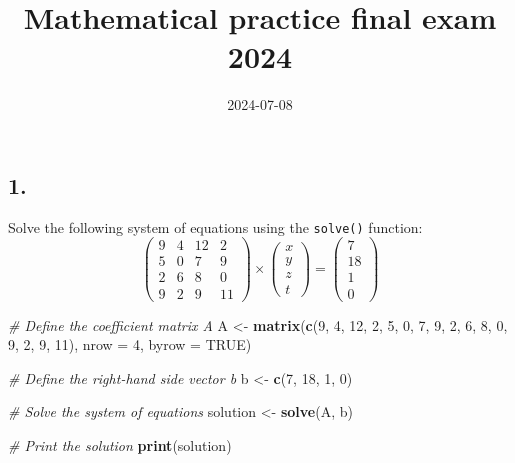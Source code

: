 \documentclass[
]{article}
\title{Mathematical practice final exam 2024}
\author{}
\date{\vspace{-2.5em}2024-07-08}
\newenvironment{Shaded}{\begin{snugshade}}{\end{snugshade}}
\newcommand{\AttributeTok}[1]{\textcolor[rgb]{0.13,0.29,0.53}{#1}}
\newcommand{\CommentTok}[1]{\textcolor[rgb]{0.56,0.35,0.01}{\textit{#1}}}
\newcommand{\ConstantTok}[1]{\textcolor[rgb]{0.56,0.35,0.01}{#1}}
\newcommand{\DecValTok}[1]{\textcolor[rgb]{0.00,0.00,0.81}{#1}}
\newcommand{\FunctionTok}[1]{\textcolor[rgb]{0.13,0.29,0.53}{\textbf{#1}}}
\newcommand{\NormalTok}[1]{#1}
\newcommand{\OtherTok}[1]{\textcolor[rgb]{0.56,0.35,0.01}{#1}}
\begin{document}
\maketitle

\subsection{1.}\label{section}

Solve the following system of equations using the \texttt{solve()}
function: \[
\left(\begin{array}{cccc}
9 & 4 & 12 & 2 \\
5 & 0 & 7 & 9 \\
2 & 6 & 8 & 0 \\
9 & 2 & 9 & 11
\end{array}\right) \times\left(\begin{array}{l}
x \\
y \\
z \\
t
\end{array}\right)=\left(\begin{array}{c}
7 \\
18 \\
1 \\
0
\end{array}\right)
\]

\begin{Shaded}
\begin{Highlighting}[]
\CommentTok{\# Define the coefficient matrix A}
\NormalTok{A }\OtherTok{\textless{}{-}} \FunctionTok{matrix}\NormalTok{(}\FunctionTok{c}\NormalTok{(}\DecValTok{9}\NormalTok{, }\DecValTok{4}\NormalTok{, }\DecValTok{12}\NormalTok{, }\DecValTok{2}\NormalTok{,}
              \DecValTok{5}\NormalTok{, }\DecValTok{0}\NormalTok{, }\DecValTok{7}\NormalTok{, }\DecValTok{9}\NormalTok{,}
              \DecValTok{2}\NormalTok{, }\DecValTok{6}\NormalTok{, }\DecValTok{8}\NormalTok{, }\DecValTok{0}\NormalTok{,}
              \DecValTok{9}\NormalTok{, }\DecValTok{2}\NormalTok{, }\DecValTok{9}\NormalTok{, }\DecValTok{11}\NormalTok{), }
            \AttributeTok{nrow =} \DecValTok{4}\NormalTok{, }\AttributeTok{byrow =} \ConstantTok{TRUE}\NormalTok{)}

\CommentTok{\# Define the right{-}hand side vector b}
\NormalTok{b }\OtherTok{\textless{}{-}} \FunctionTok{c}\NormalTok{(}\DecValTok{7}\NormalTok{, }\DecValTok{18}\NormalTok{, }\DecValTok{1}\NormalTok{, }\DecValTok{0}\NormalTok{)}

\CommentTok{\# Solve the system of equations}
\NormalTok{solution }\OtherTok{\textless{}{-}} \FunctionTok{solve}\NormalTok{(A, b)}

\CommentTok{\# Print the solution}
\FunctionTok{print}\NormalTok{(solution)}
\end{Highlighting}
\end{Shaded}
\end{document}
